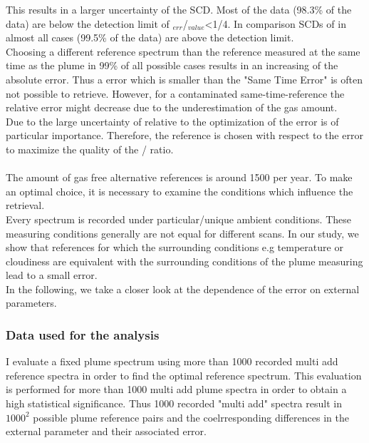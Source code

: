 %
This results in a larger uncertainty of the   SCD. Most of the  data (98.3\% of the data) are below the detection limit of $_{err}$/$_{value}$<1/4. In comparison SCDs of  in almost all cases (99.5\% of the data)  are above the detection limit. \\
%
Choosing a different reference spectrum than the reference measured at the same time as the plume in 99\% of all possible cases results in an increasing of the absolute error. 
Thus a  error which is smaller than the "Same Time Error" is often not  possible to retrieve. 
However, for a contaminated same-time-reference the relative error might decrease due to the underestimation of the gas amount. \\
Due to the large uncertainty of  relative to  the optimization of the  error is of particular importance. Therefore, the reference is chosen with respect to the  error to maximize the quality of the / ratio. \\
\\
The amount of gas free alternative references is around 1500 per year. To make an optimal choice, it is necessary to examine the conditions which influence the  retrieval.\\
Every spectrum is recorded under particular/unique ambient conditions. These measuring conditions generally are not equal for different scans. In our study, we show that references for which the surrounding conditions e.g temperature or cloudiness are equivalent with the surrounding conditions of the  plume measuring lead to a small error.\\
In the following, we take a closer look at the dependence of the  error on external parameters. 
%
\subsubsection*{Data used for the analysis}
I evaluate a fixed plume spectrum using more than 1000 recorded multi add reference spectra in order to find the optimal reference spectrum. This evaluation is performed for more than 1000 multi add plume spectra in order to obtain a high statistical significance. Thus 1000 recorded "multi add" spectra result in $1000^2$ possible plume reference pairs and the coelrresponding differences in the external parameter and their associated  error. 


